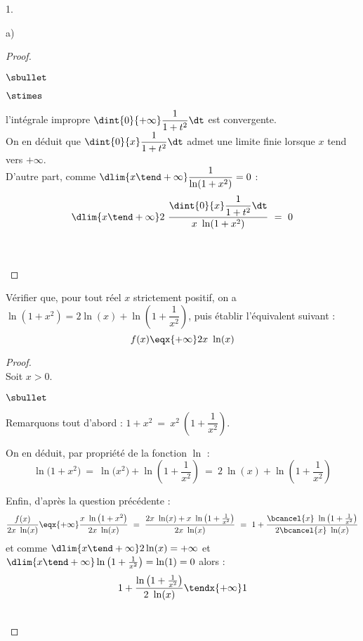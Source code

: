 \documentclass[11pt]{article}%
\begin{document}
\begin{noliste}{1.}
\begin{noliste}{a)}
\begin{proof}
\begin{noliste}{$\sbullet$}
\begin{noliste}{$\stimes$}
        \item l'intégrale impropre $\dint{0}{+\infty} \dfrac{1}{1 +
            t^2} \dt$ est convergente.\\
          On en déduit que $\dint{0}{x} \dfrac{1}{1 + t^2} \dt$ admet
          une limite finie lorsque $x$ tend vers $+\infty$.\\
          D'autre part, comme $\dlim{x \tend +\infty} \dfrac{1}{\ln(1
            + x^2)} = 0$ :
          \[
          \dlim{x \tend +\infty} 2 \ \dfrac{\dint{0}{x} \dfrac{1}{1 +
              t^2} \dt}{x \ \ln(1 + x^2)} \ = \ 0
          \]
        \end{noliste}
      \end{noliste}
      ~\\[-.8cm]




      ~\\[-1.5cm]
    \end{proof}
    
  \item Vérifier que, pour tout réel $x$ strictement positif, on a
    $\ln(1 + x^2) = 2 \ln(x) + \ln \left( 1 + \dfrac{1}{x^2} \right)$,
    puis établir l'équivalent suivant :
    \[
    f(x) \eqx{+\infty} 2x \ \ln(x)
    \]

    \begin{proof}~\\%
      Soit $x > 0$.
      \begin{noliste}{$\sbullet$}
      \item Remarquons tout d'abord : $1 + x^2 \ = \ x^2 \ \left(1 +
          \dfrac{1}{x^2} \right)$.

      \item On en déduit, par propriété de la fonction $\ln$ :
        \[
        \ln\big( 1 + x^2 \big) \ = \ \ln\big (x^2 \big) + \ln \left(1
          + \dfrac{1}{x^2} \right) \ = \ 2 \ \ln(x) + \ln \left(1 +
          \dfrac{1}{x^2} \right)
        \]

      \item Enfin, d'après la question précédente :
        \[
        \dfrac{f(x)}{2x \ \ln(x)} \eqx{+\infty} \dfrac{x \ \ln\big( 1
          + x^2 \big)}{2x \ \ln(x)} \ = \ \dfrac{2x \ \ln(x) + x \ \ln
          \left(1 + \frac{1}{x^2} \right)}{2x \ \ln(x)} \ = \ 1 +
        \dfrac{\bcancel{x} \ \ln \left(1 + \frac{1}{x^2} \right)}{2
          \bcancel{x} \ \ln(x)}
        \]
        et comme $\dlim{x \tend +\infty} 2 \ln(x) = +\infty$ et
        $\dlim{x \tend + \infty} \ln \left(1 + \frac{1}{x^2} \right) =
        \ln(1) = 0$ alors :
        \[
        1 + \dfrac{\ln \left(1 + \frac{1}{x^2} \right)}{2 \ \ln(x)}
        \tendx{+\infty} 1
        \]
      \end{noliste}
      ~\\[-1.2cm]
    \end{proof}


\end{noliste}
\end{noliste}
\end{document}
